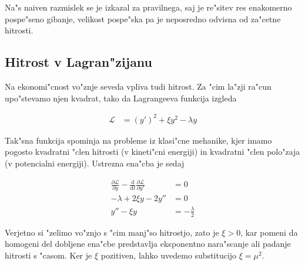 \documentclass[12pt]{article}
\newcommand{\dd}{\mathrm{d}}
\begin{document}
Na"s naiven razmislek se je izkazal za pravilnega, saj je re"sitev res enakomerno pospe"seno gibanje, velikost pospe"ska pa je neposredno odvisna od za"cetne hitrosti. 

\subsection{Hitrost v Lagran"zijanu}

Na ekonomi"cnost vo"znje seveda vpliva tudi hitrost. Za "cim la"zji ra"cun upo"stevamo njen kvadrat, tako da Lagrangeeva funkcija izgleda 

\begin{align}
  \mathcal L &= (y')^2 + \xi y^2 - \lambda y
\end{align}

Tak"sna funkcija spominja na probleme iz klasi"cne mehanike, kjer imamo pogosto kvadratni "clen hitrosti (v kineti"cni energiji) in kvadratni "clen polo"zaja (v potencialni energiji). Ustrezna ena"cba je sedaj

\begin{align}
  \frac{\partial \mathcal{L}}{\partial y} - \frac{\dd}{\dd t}\frac{\partial \mathcal L}{\partial y'} &= 0 \\
-\lambda + 2\xi y - 2y'' &= 0 \\
y'' - \xi y &= -\frac{\lambda}{2}
\end{align}

Verjetno si "zelimo vo"znjo s "cim manj"so hitrostjo, zato je $\xi > 0$, kar pomeni da homogeni del dobljene ena"cbe predstavlja eksponentno nara"scanje ali padanje hitrosti s "casom. Ker je $\xi$ pozitiven, lahko uvedemo substitucijo $\xi = \mu^2$. 
\end{document}

